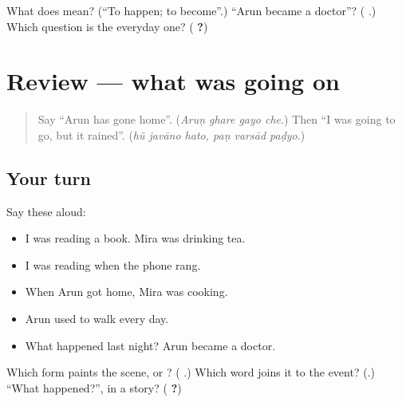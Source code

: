 \begin{tcolorbox}[breakable,colback=teal!4,colframe=teal!35!black,title={Before you move on}]
What does \textbf{} mean? (\textquotedblleft{}To happen; to become\textquotedblright{}.) \textquotedblleft{}Arun became a doctor\textquotedblright{}? (\textbf{  }.) Which question is the everyday one? (\textbf{ ?})
\end{tcolorbox}
\section[(review)]{Review — what was going on}

\label{lesson:GU-R275-the-scene}



\begin{quote}
Say \textquotedblleft{}Arun has gone home\textquotedblright{}. (\emph{Aruṇ ghare gayo che}.) Then \textquotedblleft{}I was going to go, but it rained\textquotedblright{}. (\emph{hũ javāno hato, paṇ varsād paḍyo}.)
\end{quote}

\subsection*{Your turn}
Say these aloud:

\begin{itemize}
\raggedright
  \item I was reading a book. Mira was drinking tea.
  \item I was reading when the phone rang.
  \item When Arun got home, Mira was cooking.
  \item Arun used to walk every day.
  \item What happened last night? Arun became a doctor.
\end{itemize}

\begin{tcolorbox}[breakable,colback=teal!4,colframe=teal!35!black,title={Before you move on}]
Which form paints the scene, \textbf{ } or \textbf{}? (\textbf{ }.) Which word joins it to the event? (\textbf{}.) \textquotedblleft{}What happened?\textquotedblright{}, in a story? (\textbf{ ?})
\end{tcolorbox}

